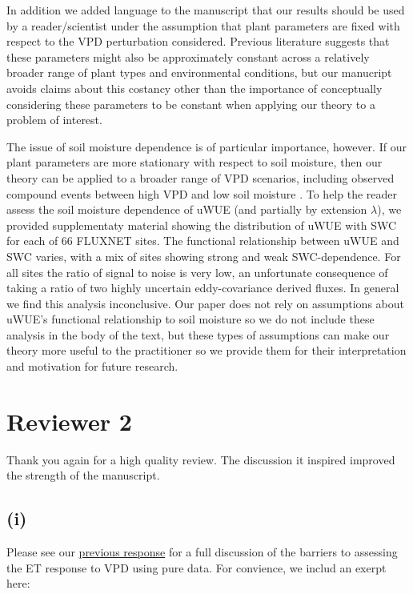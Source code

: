 \documentclass[12pt]{article}
\begin{document}
In addition we added language to the manuscript that our results
should be used by a reader/scientist under the assumption that plant
parameters are fixed with respect to the VPD perturbation
considered. Previous literature \citep{Zhou_2015, Lin_2015} suggests
that these parameters might also be approximately constant across a
relatively broader range of plant types and environmental conditions,
but our manucript avoids claims about this costancy other than the
importance of conceptually considering these parameters to be constant
when applying our theory to a problem of interest.

The issue of soil moisture dependence is of particular importance,
however. If our plant parameters are more stationary with respect to
soil moisture, then our theory can be applied to a broader range of
VPD scenarios, including observed compound events between high VPD and
low soil moisture \citep{Zhou_2019}. To help the reader assess the
soil moisture dependence of uWUE (and partially by extension
$\lambda$), we provided supplementaty material showing the
distribution of uWUE with SWC for each of 66 FLUXNET sites. The
functional relationship between uWUE and SWC varies, with a mix of
sites showing strong and weak SWC-dependence. For all sites the ratio
of signal to noise is very low, an unfortunate consequence of taking a
ratio of two highly uncertain eddy-covariance derived fluxes. In
general we find this analysis inconclusive. Our paper does not rely on
assumptions about uWUE's functional relationship to soil moisture so
we do not include these analysis in the body of the text, but these
types of assumptions can make our theory more useful to the
practitioner so we provide them for their interpretation and
motivation for future research.

\section{Reviewer 2}

Thank you again for a high quality review. The discussion it
inspired improved the strength of the manuscript.

\subsection{(i)}
\label{(i)}
Please see our
\href{https://www.hydrol-earth-syst-sci-discuss.net/hess-2018-553/hess-2018-553-AC2-supplement.pdf}{previous
  response} for a full discussion of the barriers to assessing the ET
response to VPD using pure data. For convience, we includ an exerpt
here:
\end{document}
